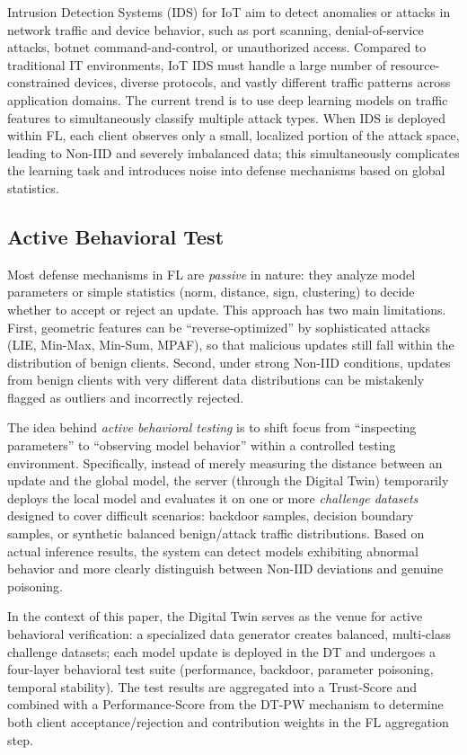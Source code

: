 \documentclass[runningheads]{llncs}
\begin{document}
Intrusion Detection Systems (IDS) for IoT aim to detect anomalies or attacks in network traffic and device behavior, such as port scanning, denial-of-service attacks, botnet command-and-control, or unauthorized access. Compared to traditional IT environments, IoT IDS must handle a large number of resource-constrained devices, diverse protocols, and vastly different traffic patterns across application domains. The current trend is to use deep learning models on traffic features to simultaneously classify multiple attack types. When IDS is deployed within FL, each client observes only a small, localized portion of the attack space, leading to Non-IID and severely imbalanced data; this simultaneously complicates the learning task and introduces noise into defense mechanisms based on global statistics.

\subsection{Active Behavioral Test}

Most defense mechanisms in FL are \emph{passive} in nature: they analyze model parameters or simple statistics (norm, distance, sign, clustering) to decide whether to accept or reject an update. This approach has two main limitations. First, geometric features can be ``reverse-optimized'' by sophisticated attacks (LIE, Min-Max, Min-Sum, MPAF), so that malicious updates still fall within the distribution of benign clients. Second, under strong Non-IID conditions, updates from benign clients with very different data distributions can be mistakenly flagged as outliers and incorrectly rejected.

The idea behind \emph{active behavioral testing} is to shift focus from ``inspecting parameters'' to ``observing model behavior'' within a controlled testing environment. Specifically, instead of merely measuring the distance between an update and the global model, the server (through the Digital Twin) temporarily deploys the local model and evaluates it on one or more \emph{challenge datasets} designed to cover difficult scenarios: backdoor samples, decision boundary samples, or synthetic balanced benign/attack traffic distributions. Based on actual inference results, the system can detect models exhibiting abnormal behavior and more clearly distinguish between Non-IID deviations and genuine poisoning.

In the context of this paper, the Digital Twin serves as the venue for active behavioral verification: a specialized data generator creates balanced, multi-class challenge datasets; each model update is deployed in the DT and undergoes a four-layer behavioral test suite (performance, backdoor, parameter poisoning, temporal stability). The test results are aggregated into a Trust-Score and combined with a Performance-Score from the DT-PW mechanism to determine both client acceptance/rejection and contribution weights in the FL aggregation step.
\end{document}
